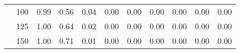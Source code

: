 \begin{table}[t]
\begin{center}
\begin{subtable}[c]{\textwidth}
\begin{center}
\begin{tabular}{rcccccccccc}
                                        & \multicolumn{1}{c|}{100}  & \num{0.99}  & \num{0.56}  & \num{0.04}  & \num{0.00}  & \num{0.00}  & \num{0.00}  & \num{0.00}  & \num{0.00}  & \num{0.00}  \\
                                        & \multicolumn{1}{c|}{125}  & \num{1.00}  & \num{0.64}  & \num{0.02}  & \num{0.00}  & \num{0.00}  & \num{0.00}  & \num{0.00}  & \num{0.00}  & \num{0.00}  \\
                                        & \multicolumn{1}{c|}{150}  & \num{1.00}  & \num{0.71}  & \num{0.01}  & \num{0.00}  & \num{0.00}  & \num{0.00}  & \num{0.00}  & \num{0.00}  & \num{0.00}  \\
                                    \end{tabular}
            \end{center}
        \end{subtable}

        \vspace{5mm}


\end{center}
\end{table}
